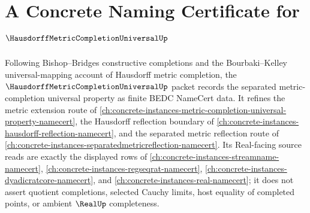 \chapter{A Concrete Naming Certificate for $\HausdorffMetricCompletionUniversalUp$}
\label{ch:concrete-instances-hausdorff-metric-completion-universal-namecert}

Following Bishop--Bridges constructive completions and the Bourbaki--Kelley universal-mapping account of Hausdorff metric completion, the $\HausdorffMetricCompletionUniversalUp$ packet records the separated metric-completion universal property as finite BEDC NameCert data. It refines the metric extension route of \autoref{ch:concrete-instances-metric-completion-universal-property-namecert}, the Hausdorff reflection boundary of \autoref{ch:concrete-instances-hausdorff-reflection-namecert}, and the separated metric reflection route of \autoref{ch:concrete-instances-separatedmetricreflection-namecert}. Its Real-facing source reads are exactly the displayed rows of \autoref{ch:concrete-instances-streamname-namecert}, \autoref{ch:concrete-instances-regseqrat-namecert}, \autoref{ch:concrete-instances-dyadicratcore-namecert}, and \autoref{ch:concrete-instances-real-namecert}; it does not assert quotient completions, selected Cauchy limits, host equality of completed points, or ambient $\RealUp$ completeness.

